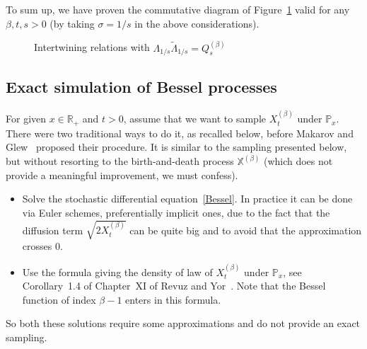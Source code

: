 \documentclass[AHL,Unicode,longabstracts]{cedram}
\newcommand{\cX}{{\discret X}}
\newcommand{\PP}{\mathbb{P}}
\newcommand{\RR}{\mathbb{R}}
\newcommand{\fm}{\mathfrak{m}}
\newcommand{\wi}{\widetilde}
\newcommand{\dBs}{{\discret{Q}}}
\newcommand{\Bs}{Q}
\newcommand{\esL}{\mathbf{L}}
\newcommand{\esLd}{\ell}
\newcommand{\discret}[1]{\mathds{#1}}
\begin{document}
To sum up, we have proven the commutative diagram of Figure~\ref{fig3} valid for any $\beta,t,s>0$ (by taking $\sigma=1/s$ in the above considerations).
\begin{figure}[ht]\centering
{}
\caption{Intertwining relations with $\Lambda_{1/s}\wi\Lambda_{1/s}=\Bs^{(\beta)}_s$}\label{fig3}
\end{figure}

\subsection{Exact simulation of Bessel processes}\label{Makarov}

For given $x\in\RR_+$ and $t>0$, assume that we want to sample $X^{(\beta)}_t$ under $\PP_x$. There were two traditional ways to do it, as recalled below, before Makarov and Glew~\cite{MR2747817} proposed their procedure. It is similar to the sampling presented below, but without resorting to the birth-and-death process $\cX^{(\beta)}$ (which does not provide a meaningful improvement, we must confess).
\begin{itemize}
\item Solve the stochastic differential equation~\eqref{Bessel}. In practice it can be done via Euler schemes, preferentially implicit ones, due to the fact that the diffusion term $\sqrt{2X^{(\beta)}_t}$ can be quite big and to avoid that the approximation crosses 0.
\item Use the formula giving the density of law of $X^{(\beta)}_t$ under $\PP_x$, see Corollary~1.4 of Chapter~XI of Revuz and Yor~\cite{MR1725357}. Note that the Bessel function of index $\beta-1$ enters in this formula.
\end{itemize}
So both these solutions require some approximations and do not provide an exact sampling.
\end{document}
